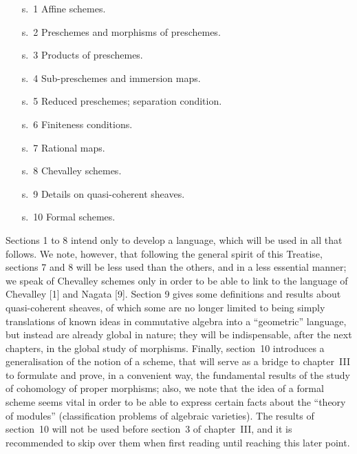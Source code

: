 \documentclass[../main.tex]{subfiles}
\begin{document}
\begin{itemize}
    \item[s.~1] Affine schemes.
    \item[s.~2] Preschemes and morphisms of preschemes.
    \item[s.~3] Products of preschemes.
    \item[s.~4] Sub-preschemes and immersion maps.
    \item[s.~5] Reduced preschemes; separation condition.
    \item[s.~6] Finiteness conditions.
    \item[s.~7] Rational maps.
    \item[s.~8] Chevalley schemes.
    \item[s.~9] Details on quasi-coherent sheaves.
    \item[s.~10] Formal schemes.
\end{itemize}

Sections 1 to 8 intend only to develop a language, which will be used in all that follows.
We note, however, that following the general spirit of this Treatise, sections 7 and 8 will be less used than the others, and in a less essential manner; we speak of Chevalley schemes only in order to be able to link to the language of Chevalley [1] and Nagata [9].
Section 9 gives some definitions and results about quasi-coherent sheaves, of which some are no longer limited to being simply translations of known ideas in commutative algebra into a ``geometric'' language, but instead are already global in nature; they will be indispensable, after the next chapters, in the global study of morphisms.
Finally, section~10 introduces a generalisation of the notion of a scheme, that will serve as a bridge to chapter~III to formulate and prove, in a convenient way, the fundamental results of the study of cohomology of proper morphisms; also, we note that the idea of a formal scheme seems vital in order to be able to express certain facts about the ``theory of modules'' (classification problems of algebraic varieties).
The results of section~10 will not be used before section~3 of chapter~III, and it is recommended to skip over them when first reading until reaching this later point.
\end{document}

